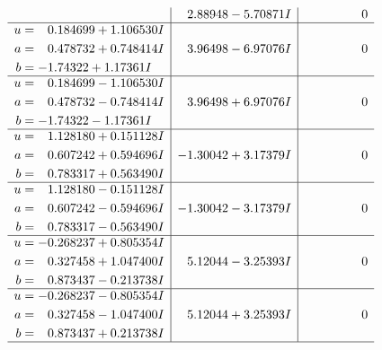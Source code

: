 \documentclass[1p]{elsarticle_modified}
\theoremstyle{definition}
\begin{document}
$$\begin{array}{c|c|c}
 & \phantom{-}2.88948 - 5.70871 I & \phantom{-0.000000 } 0 \\ \hline\begin{aligned}
u &= \phantom{-}0.184699 + 1.106530 I \\
a &= \phantom{-}0.478732 + 0.748414 I \\
b &= -1.74322 + 1.17361 I\end{aligned}
 & \phantom{-}3.96498 - 6.97076 I & \phantom{-0.000000 } 0 \\ \hline\begin{aligned}
u &= \phantom{-}0.184699 - 1.106530 I \\
a &= \phantom{-}0.478732 - 0.748414 I \\
b &= -1.74322 - 1.17361 I\end{aligned}
 & \phantom{-}3.96498 + 6.97076 I & \phantom{-0.000000 } 0 \\ \hline\begin{aligned}
u &= \phantom{-}1.128180 + 0.151128 I \\
a &= \phantom{-}0.607242 + 0.594696 I \\
b &= \phantom{-}0.783317 + 0.563490 I\end{aligned}
 & -1.30042 + 3.17379 I & \phantom{-0.000000 } 0 \\ \hline\begin{aligned}
u &= \phantom{-}1.128180 - 0.151128 I \\
a &= \phantom{-}0.607242 - 0.594696 I \\
b &= \phantom{-}0.783317 - 0.563490 I\end{aligned}
 & -1.30042 - 3.17379 I & \phantom{-0.000000 } 0 \\ \hline\begin{aligned}
u &= -0.268237 + 0.805354 I \\
a &= \phantom{-}0.327458 + 1.047400 I \\
b &= \phantom{-}0.873437 - 0.213738 I\end{aligned}
 & \phantom{-}5.12044 - 3.25393 I & \phantom{-0.000000 } 0 \\ \hline\begin{aligned}
u &= -0.268237 - 0.805354 I \\
a &= \phantom{-}0.327458 - 1.047400 I \\
b &= \phantom{-}0.873437 + 0.213738 I\end{aligned}
 & \phantom{-}5.12044 + 3.25393 I & \phantom{-0.000000 } 0\\
 \hline 
 \end{array}$$\newpage$$\begin{array}{c|c|c}  

\end{array}$$
\end{document}
